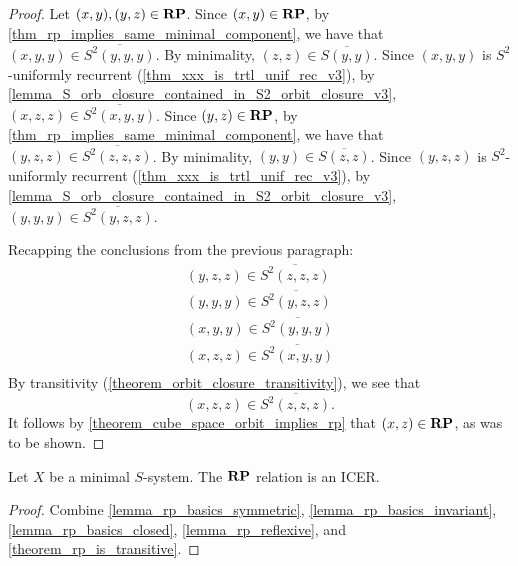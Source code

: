 \begin{proof}
\leanok{}
    Let $(x,y), (y,z) \in \mathbf{RP}$.  Since $(x,y) \in \mathbf{RP}$, by \cref{thm_rp_implies_same_minimal_component}, we have that $(x,y,y) \in \overline{S^2(y,y,y)}$.  By minimality, $(z,z) \in \overline{S(y,y)}$.  Since $(x,y,y)$ is $S^2$-uniformly recurrent (\cref{thm_xxx_is_trtl_unif_rec_v3}), by \cref{lemma_S_orb_closure_contained_in_S2_orbit_closure_v3}, $(x,z,z) \in \overline{S^2(x,y,y)}$.  Since $(y,z) \in \mathbf{RP}$, by \cref{thm_rp_implies_same_minimal_component}, we have that $(y,z,z) \in \overline{S^2(z,z,z)}$.  By minimality, $(y,y) \in \overline{S(z,z)}$.  Since $(y,z,z)$ is $S^2$-uniformly recurrent (\cref{thm_xxx_is_trtl_unif_rec_v3}), by \cref{lemma_S_orb_closure_contained_in_S2_orbit_closure_v3}, $(y,y,y) \in \overline{S^2(y,z,z)}$.
    
    Recapping the conclusions from the previous paragraph:
    \begin{align*}
        (y,z,z) \in \overline{S^2(z,z,z)}\\
        (y,y,y) \in \overline{S^2(y,z,z)}\\
        (x,y,y) \in \overline{S^2(y,y,y)}\\
        (x,z,z) \in \overline{S^2(x,y,y)}\\
    \end{align*}
    By transitivity (\cref{theorem_orbit_closure_transitivity}), we see that
    \[(x,z,z) \in \overline{S^2(z,z,z)}.\]
    It follows by \cref{theorem_cube_space_orbit_implies_rp} that $(x,z) \in \mathbf{RP}$, as was to be shown.
\end{proof}

\begin{theorem}
\label{theorem_rp_is_ICER}
\leanok{}
    Let $X$ be a minimal $S$-system.  The $\mathbf{RP}$ relation is an ICER.
\end{theorem}

\begin{proof}
\leanok{}
    Combine \cref{lemma_rp_basics_symmetric}, \cref{lemma_rp_basics_invariant}, \cref{lemma_rp_basics_closed}, \cref{lemma_rp_reflexive}, and \cref{theorem_rp_is_transitive}.
\end{proof}

